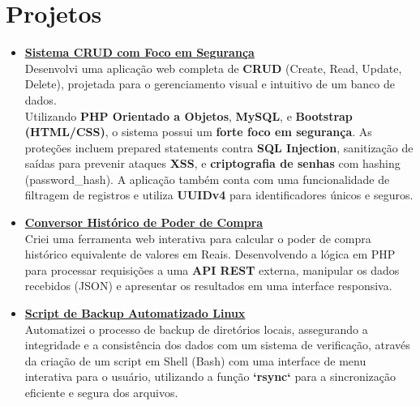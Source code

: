 \documentclass[a4paper,12pt]{article}
\begin{document}
\section*{Projetos}
\begin{itemize}[noitemsep, nolistsep, leftmargin=*, itemsep=8pt]
    \item 
        \href{https://github.com/nicolas-mendes/CRUD_PHP}{\textbf{Sistema CRUD com Foco em Segurança}} \\ 
Desenvolvi uma aplicação web completa de \textbf{CRUD} (Create, Read, Update, Delete), projetada para o gerenciamento visual e intuitivo de um banco de dados. \\
Utilizando \textbf{PHP Orientado a Objetos}, \textbf{MySQL}, e \textbf{Bootstrap (HTML/CSS)}, o sistema possui um \textbf{forte foco em segurança}. As proteções incluem prepared statements contra \textbf{SQL Injection}, sanitização de saídas para prevenir ataques \textbf{XSS}, e \textbf{criptografia de senhas} com hashing (password\_hash). A aplicação também conta com uma funcionalidade de filtragem de registros e utiliza \textbf{UUIDv4}  para identificadores únicos e seguros.

    \item 
        \href{https://github.com/nicolas-mendes/Conversor-Poder-Compra}{\textbf{Conversor Histórico de Poder de Compra}} \\
        Criei uma ferramenta web interativa para calcular o poder de compra histórico equivalente de valores em Reais. Desenvolvendo a lógica em PHP para processar requisições a uma \textbf{API REST}  externa, manipular os dados recebidos (JSON) e apresentar os resultados em uma interface responsiva.

    \item 
        \href{https://github.com/nicolas-mendes/script-backup-linux}{\textbf{Script de Backup Automatizado Linux}} \\
        Automatizei o processo de backup de diretórios locais, assegurando a integridade e a consistência dos dados com um sistema de verificação, através da criação de um script em Shell (Bash) com uma interface de menu interativa para o usuário, utilizando a função \textbf{`rsync`} para a sincronização eficiente e segura dos arquivos.
        
\end{itemize}

\end{document}
